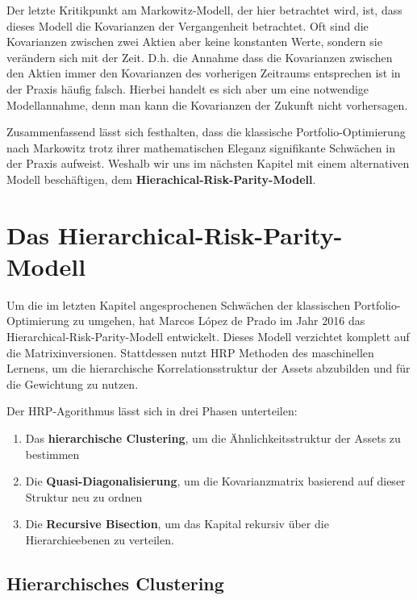 \documentclass[parskip=half]{scrartcl}
\begin{document}
	Der letzte Kritikpunkt am Markowitz-Modell, der hier betrachtet wird, ist, dass dieses Modell die Kovarianzen der Vergangenheit betrachtet. Oft sind die Kovarianzen zwischen zwei Aktien aber keine konstanten Werte, sondern sie verändern sich mit der Zeit. D.h. die Annahme dass die Kovarianzen zwischen den Aktien immer den Kovarianzen des vorherigen Zeitraums entsprechen ist in der Praxis häufig falsch. Hierbei handelt es sich aber um eine notwendige Modellannahme, denn man kann die Kovarianzen der Zukunft nicht vorhersagen.
	
	Zusammenfassend lässt sich festhalten, dass die klassische Portfolio-Optimierung nach Markowitz trotz ihrer mathematischen Eleganz signifikante Schwächen in der Praxis aufweist. Weshalb wir uns im nächsten Kapitel mit einem alternativen Modell beschäftigen, dem \textbf{Hierachical-Risk-Parity-Modell}.
	
	\clearpage
	
	\section{Das Hierarchical-Risk-Parity-Modell}
	
	Um die im letzten Kapitel angesprochenen Schwächen der klassischen Portfolio-Optimierung zu umgehen, hat Marcos López de Prado im Jahr 2016 das Hierarchical-Risk-Parity-Modell entwickelt. Dieses Modell verzichtet komplett auf die Matrixinversionen. Stattdessen nutzt HRP Methoden des maschinellen Lernens, um die hierarchische Korrelationsstruktur der Assets abzubilden und für die Gewichtung zu nutzen.
	
	Der HRP-Agorithmus lässt sich in drei Phasen unterteilen:
	
	\begin{enumerate}
		\item Das \textbf{hierarchische Clustering}, um die Ähnlichkeitsstruktur der Assets zu bestimmen
		\item Die \textbf{Quasi-Diagonalisierung}, um die Kovarianzmatrix basierend auf dieser Struktur neu zu ordnen
		\item Die \textbf{Recursive Bisection}, um das Kapital rekursiv über die Hierarchieebenen zu verteilen.
	\end{enumerate}
	
	\subsection{Hierarchisches Clustering} %
	
\end{document}

